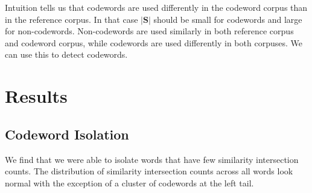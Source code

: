 \documentclass{article}
\begin{document}
    Intuition tells us that codewords are used differently in the codeword
corpus than in the reference corpus. In that case \(|\mathbf{S}|\)
should be small for codewords and large for non-codewords. Non-codewords
are used similarly in both reference corpus and codeword corpus, while
codewords are used differently in both corpuses. We can use this to
detect codewords.

    \section{Results}\label{results}

\subsection{Codeword Isolation}\label{codeword-isolation}

We find that we were able to isolate words that have few similarity
intersection counts. The distribution of similarity intersection counts
across all words look normal with the exception of a cluster of
codewords at the left tail.
\end{document}
